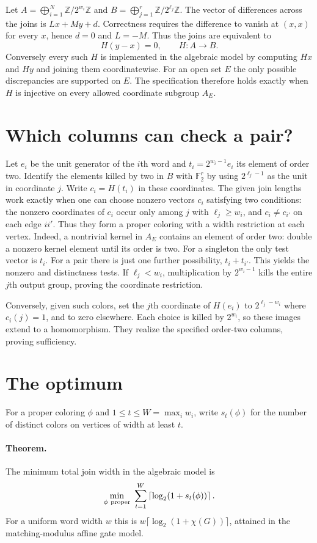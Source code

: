 \documentclass[11pt]{article}
\newcommand{\Z}{\mathbb Z}
\begin{document}
Let $A=\bigoplus_{i=1}^N\Z/2^{w_i}\Z$ and $B=\bigoplus_{j=1}^r\Z/2^{\ell_j}\Z$. The vector of differences across the joins is $Lx+My+d$. Correctness requires the difference to vanish at $(x,x)$ for every $x$, hence $d=0$ and $L=-M$. Thus the joins are equivalent to
\[
                     H(y-x)=0,\qquad H:A\longrightarrow B .
\]
Conversely every such $H$ is implemented in the algebraic model by computing $Hx$ and $Hy$ and joining them coordinatewise. For an open set $E$ the only possible discrepancies are supported on $E$. The specification therefore holds exactly when $H$ is injective on every allowed coordinate subgroup $A_E$.

\section{Which columns can check a pair?}
Let $e_i$ be the unit generator of the $i$th word and $t_i=2^{w_i-1}e_i$ its element of order two. Identify the elements killed by two in $B$ with $\mathbb F_2^r$ by using $2^{\ell_j-1}$ as the unit in coordinate $j$. Write $c_i=H(t_i)$ in these coordinates. The given join lengths work exactly when one can choose nonzero vectors $c_i$ satisfying two conditions: the nonzero coordinates of $c_i$ occur only among $j$ with $\ell_j\ge w_i$, and $c_i\ne c_{i'}$ on each edge $ii'$. Thus they form a proper coloring with a width restriction at each vertex.
Indeed, a nontrivial kernel in $A_E$ contains an element of order two: double a nonzero kernel element until its order is two. For a singleton the only test vector is $t_i$. For a pair there is just one further possibility, $t_i+t_{i'}$. This yields the nonzero and distinctness tests. If $\ell_j<w_i$, multiplication by $2^{w_i-1}$ kills the entire $j$th output group, proving the coordinate restriction.

Conversely, given such colors, set the $j$th coordinate of $H(e_i)$ to $2^{\ell_j-w_i}$ where $c_i(j)=1$, and to zero elsewhere. Each choice is killed by $2^{w_i}$, so these images extend to a homomorphism. They realize the specified order-two columns, proving sufficiency.

\section{The optimum}
For a proper coloring $\phi$ and $1\le t\le W=\max_i w_i$, write $s_t(\phi)$ for the number of distinct colors on vertices of width at least $t$.

\paragraph{Theorem.} The minimum total join width in the algebraic model is
\[
 \min_{\phi\ {\rm proper}}\ \sum_{t=1}^W
                   \left\lceil\log_2(1+s_t(\phi))\right\rceil .
\]
For a uniform word width $w$ this is $w\lceil\log_2(1+\chi(G))\rceil$, attained in the matching-modulus affine gate model.
\end{document}
